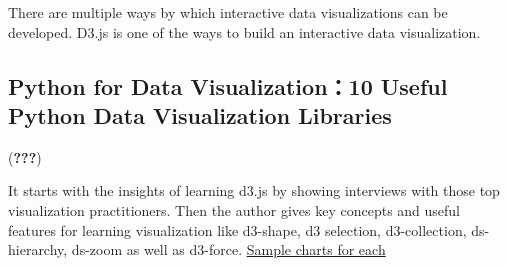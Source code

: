 \documentclass[]{book}
\theoremstyle{definition}
\theoremstyle{definition}
\theoremstyle{definition}
\theoremstyle{remark}
\begin{document}
There are multiple ways by which interactive data visualizations can be
developed. D3.js is one of the ways to build an interactive data
visualization.

\subsection{Python for Data Visualization：10 Useful Python Data
Visualization
Libraries}\label{python-for-data-visualization10-useful-python-data-visualization-libraries}

({\textbf{???}})

It starts with the insights of learning d3.js by showing interviews with
those top visualization practitioners. Then the author gives key
concepts and useful features for learning visualization like d3-shape,
d3 selection, d3-collection, ds-hierarchy, ds-zoom as well as d3-force.
\href{https://blog.modeanalytics.com/python-data-visualization-libraries/}{Sample
charts for each}
\end{document}
